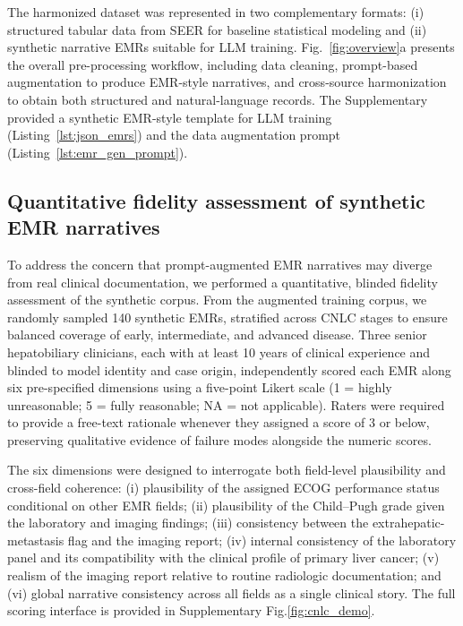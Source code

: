 \documentclass{article}
\begin{document}
The harmonized dataset was represented in two complementary formats: (i) structured tabular data from SEER for baseline statistical modeling and (ii) synthetic narrative EMRs suitable for LLM training. Fig.~\ref{fig:overview}a presents the overall pre-processing workflow, including data cleaning, prompt-based augmentation to produce EMR-style narratives, and cross-source harmonization to obtain both structured and natural-language records. The Supplementary provided a synthetic EMR-style template for LLM training (Listing~\ref {lst:json_emrs}) and the data augmentation prompt (Listing~\ref{lst:emr_gen_prompt}).

\subsection{Quantitative fidelity assessment of synthetic EMR narratives}
To address the concern that prompt-augmented EMR narratives may diverge from real clinical documentation, we performed a quantitative, blinded fidelity assessment of the synthetic corpus. From the augmented training corpus, we randomly sampled 140 synthetic EMRs, stratified across CNLC stages to ensure balanced coverage of early, intermediate, and advanced disease. Three senior hepatobiliary clinicians, each with at least 10 years of clinical experience and blinded to model identity and case origin, independently scored each EMR along six pre-specified dimensions using a five-point Likert scale (1 = highly unreasonable; 5 = fully reasonable; NA = not applicable). Raters were required to provide a free-text rationale whenever they assigned a score of 3 or below, preserving qualitative evidence of failure modes alongside the numeric scores.

The six dimensions were designed to interrogate both field-level plausibility and cross-field coherence: (i) plausibility of the assigned ECOG performance status conditional on other EMR fields; (ii) plausibility of the Child–Pugh grade given the laboratory and imaging findings; (iii) consistency between the extrahepatic-metastasis flag and the imaging report; (iv) internal consistency of the laboratory panel and its compatibility with the clinical profile of primary liver cancer; (v) realism of the imaging report relative to routine radiologic documentation; and (vi) global narrative consistency across all fields as a single clinical story. The full scoring interface is provided in Supplementary Fig.\ref{fig:cnlc_demo}.
\end{document}

